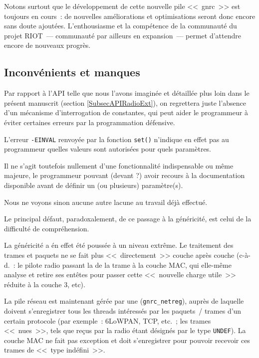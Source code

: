 Notons surtout que le développement de cette nouvelle pile <<~gnrc~>> est
toujours en cours~: de nouvelles améliorations et optimisations seront donc
encore sans doute ajoutées. L'enthousiasme et la compétence de la communauté
du projet RIOT~--- communauté par ailleurs en expansion~--- permet
d'attendre encore de nouveaux progrès.


\subsection{Inconvénients et manques}
\label{SubsecDefautsGnrc}

Par rapport à l'API telle que nous l'avons imaginée et détaillée plus loin
dans le présent manuscrit (section \vref{SubsecAPIRadioExt}), on regrettera
juste l'absence d'un mécanisme d'interrogation de constantes, qui peut aider
le programmeur à éviter certaines erreurs par la programmation défensive.

L'erreur \texttt{-EINVAL} renvoyée par la fonction \texttt{set()} n'indique
en effet pas au programmeur quelles valeurs sont autorisées pour quels
paramètres.

Il ne s'agit toutefois nullement d'une fonctionnalité indispensable ou
même majeure, le programmeur pouvant (devant ?) avoir recours à la
documentation disponible avant de définir un (ou plusieurs) paramètre(s).

Nous ne voyons sinon aucune autre lacune au travail déjà effectué.

\bigskip

Le principal défaut, paradoxalement, de ce passage à la généricité, est
celui de la difficulté de compréhension.

\bigskip

La généricité a én effet été poussée à un niveau extrême. Le traitement des
trames et paquets ne se fait plus <<~directement~>> couche après couche
(c-à-d.~: le pilote radio passant la  de la trame à la couche
MAC, qui elle-même analyse et retire ses entêtes pour passer cette
<<~nouvelle charge utile~>> réduite à la couche 3, etc).

La pile réseau est maintenant gérée par une 
(\texttt{gnrc\_netreg}), auprès de laquelle doivent s'enregistrer
tous les threads intéressés par les paquets~/ trames d'un certain protocole
(par exemple~: 6LoWPAN, TCP, etc.~; les trames <<~nues~>>, tels que reçus
par la radio étant désignés par le type \texttt{UNDEF}). La couche MAC
ne fait pas exception et doit s'enregistrer pour pouvoir recevoir ces
trames de <<~type indéfini~>>.

